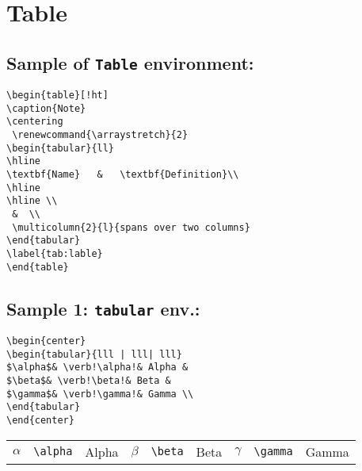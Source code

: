 \section{Table}

\subsection{Sample of \texttt{Table} environment:}
\begin{SBN}
\color{blue}
\begin{verbatim}
\begin{table}[!ht]
\caption{Note} 
\centering
 \renewcommand{\arraystretch}{2}
\begin{tabular}{ll} 
\hline
\textbf{Name}   &   \textbf{Definition}\\ 
\hline 
\hline \\
 &  \\
 \multicolumn{2}{l}{spans over two columns}
\end{tabular}
\label{tab:lable}
\end{table}
\end{verbatim}
\end{SBN}



\subsection{Sample 1: \texttt{tabular} env.:}

\begin{SBN}
\color{blue}
\begin{verbatim}
\begin{center}
\begin{tabular}{lll | lll| lll}
$\alpha$& \verb!\alpha!& Alpha &
$\beta$& \verb!\beta!& Beta &
$\gamma$& \verb!\gamma!& Gamma \\
\end{tabular}
\end{center}    
\end{verbatim}
\end{SBN}

\begin{center}
\begin{tabular}{lll | lll| lll}
$\alpha$& \verb!\alpha!& Alpha &
$\beta$& \verb!\beta!& Beta &
$\gamma$& \verb!\gamma!& Gamma \\
\end{tabular}
\end{center}

